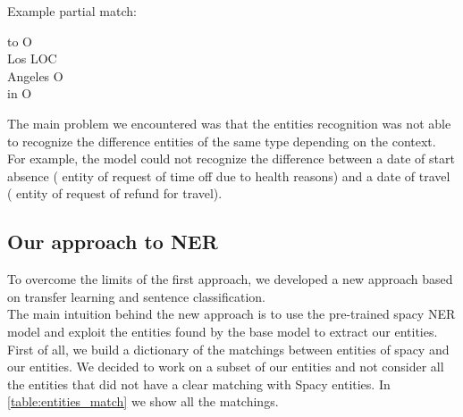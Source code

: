 Example partial match:
\begin{adjustwidth}{1cm}{}
    to O\\
    Los LOC\\
    Angeles O\\
    in O\\
\end{adjustwidth}
The main problem we encountered was that the entities recognition was not able to recognize the difference entities of the same type depending on the context. For example, the model could not recognize the difference between a date of start absence ( entity of request of time off due to health reasons) and a date of travel ( entity of request of refund for travel).

\subsection{Our approach to NER}
To overcome the limits of the first approach, we developed a new approach based on transfer learning and sentence classification. \\
The main intuition behind the new approach is to use the pre-trained spacy NER model and exploit the entities found by the base model to extract our entities. \\
First of all, we build a dictionary of the matchings between entities of spacy and our entities. We decided to work on a subset of our entities and not consider all the entities that did not have a clear matching with Spacy entities. In \autoref{table:entities_match} we show all the matchings. 
\begin{table}[h]    
    \caption{Matching of our entities with Spacy entities}\label{table:entities_match}
\end{table}
